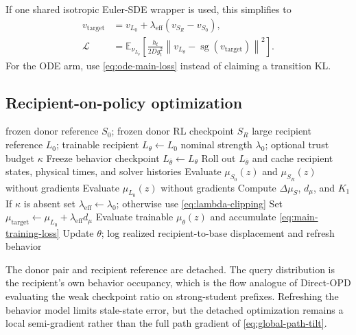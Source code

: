 \documentclass[11pt,a4paper]{article}
\newcommand{\E}{\mathbb{E}}
\newcommand{\norm}[1]{\left\lVert #1 \right\rVert}
\newcommand{\sg}{\operatorname{sg}}
\newcommand{\Sbase}{S_0}
\newcommand{\Srl}{S_R}
\newcommand{\Lbase}{L_0}
\newcommand{\Lactor}{L_\theta}
\newcommand{\Lbeh}{L_{\bar\theta}}
\newcommand{\dmuS}{\Delta\mu_S}
\theoremstyle{plain}
\theoremstyle{definition}
\begin{document}
If one shared isotropic Euler-SDE wrapper is used, this simplifies to
\begin{align}
v_{\mathrm{target}}
&=
v_{\Lbase}
+\lambda_{\mathrm{eff}}
(v_{\Srl}-v_{\Sbase}),
\label{eq:main-velocity-target}\\
\mathcal L
&=
\E_{\nu_{\Lbeh}}
\left[
\frac{h_t}{2Dg_t^2}
\norm{
v_{\Lactor}-\sg(v_{\mathrm{target}})
}^2
\right].
\label{eq:main-velocity-loss}
\end{align}
For the ODE arm, use \eqref{eq:ode-main-loss} instead of claiming a transition KL.

\subsection{Recipient-on-policy optimization}

\begin{algorithm}[htbp]
\caption{Weak-to-Strong Flow Direct-OPD}
\label{alg:flow-direct-opd}
\begin{algorithmic}[1]
\Require frozen donor reference $\Sbase$; frozen donor RL checkpoint $\Srl$
\Require large recipient reference $\Lbase$; trainable recipient $\Lactor\leftarrow\Lbase$
\Require nominal strength $\lambda_0$; optional trust budget $\kappa$
  \State Freeze behavior checkpoint $\Lbeh\leftarrow\Lactor$
  \State Roll out $\Lbeh$ and cache recipient states, physical times, and solver histories
    \State Evaluate $\mu_{\Sbase}(z)$ and $\mu_{\Srl}(z)$ without gradients
    \State Evaluate $\mu_{\Lbase}(z)$ without gradients
    \State Compute $\dmuS$, $d_\mu$, and $K_1$
    \State If $\kappa$ is absent set $\lambda_{\mathrm{eff}}\leftarrow\lambda_0$;
      otherwise use \eqref{eq:lambda-clipping}
    \State Set $\mu_{\mathrm{target}}\leftarrow
      \mu_{\Lbase}+\lambda_{\mathrm{eff}}d_\mu$
    \State Evaluate trainable $\mu_\theta(z)$ and accumulate
      \eqref{eq:main-training-loss}
  \EndFor
  \State Update $\theta$; log realized recipient-to-base displacement and refresh behavior
\EndFor
\end{algorithmic}
\end{algorithm}

The donor pair and recipient reference are detached.  The query distribution is the recipient's
own behavior occupancy, which is the flow analogue of Direct-OPD evaluating the weak checkpoint
ratio on strong-student prefixes.  Refreshing the behavior model limits stale-state error, but the
detached optimization remains a local semi-gradient rather than the full path gradient of
\eqref{eq:global-path-tilt}.
\end{document}

